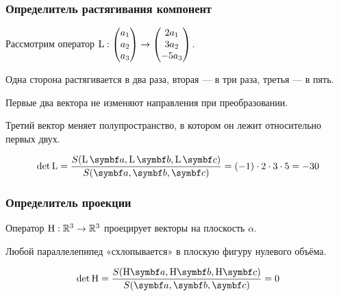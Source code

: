 \begin{frame}
    \frametitle{Определитель растягивания компонент}


    Рассмотрим оператор $\operatorname{L} : \begin{pmatrix}
      a_1 \\
      a_2 \\
      a_3 \\
    \end{pmatrix} \to 
    \begin{pmatrix}
      2a_1 \\
      3a_2 \\
      -5a_3 \\
    \end{pmatrix}$.
    

    \pause

    Одна сторона растягивается в два раза, вторая — в три раза, третья — в пять.


    Первые два вектора не изменяют направления при преобразовании.

    
    Третий вектор меняет полупространство, в котором он лежит относительно первых двух. 

    \pause

    \[
    \det \LL = \frac{S(\LL \ba, \LL \bb, \LL \bc )}{S(\ba, \bb, \bc )} = (-1)\cdot 2\cdot 3\cdot 5  = - 30
    \]

\end{frame}



\begin{frame}
    \frametitle{Определитель проекции}


    Оператор $\mathrm{H} : \mathbb{R}^3 \to \mathbb{R}^3$ проецирует векторы на плоскость $\alpha$. 

    \pause

    Любой параллелепипед «схлопывается» в плоскую фигуру нулевого объёма.

    \pause

    \[
    \det \HH = \frac{S(\HH \ba, \HH \bb, \HH \bc )}{S(\ba, \bb, \bc )} = 0
    \]

\end{frame}


